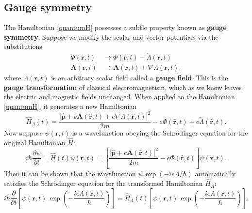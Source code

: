 \documentclass[prx,12pt]{revtex4-2}
\begin{document}
\subsection{Gauge symmetry}
\label{sec:gauge}

The Hamiltonian \eqref{quantumH} possesses a subtle property known as
\textbf{gauge symmetry}.  Suppose we modify the scalar and vector
potentials via the substitutions
\begin{align}
  \Phi(\mathbf{r},t) &\rightarrow \Phi(\mathbf{r},t) - \dot{\Lambda}(\mathbf{r},t) \label{gauge-subst-1} \\
  \mathbf{A}(\mathbf{r},t) &\rightarrow
  \mathbf{A}(\mathbf{r},t) + \nabla{\Lambda}(\mathbf{r},t),
  \label{gauge-subst-2}
\end{align}
where $\Lambda(\mathbf{r},t)$ is an arbitrary scalar field called a
\textbf{gauge field}.  This is the \textbf{gauge transformation} of
classical electromagnetism, which as we know leaves the electric and
magnetic fields unchanged.  When applied to the Hamiltonian
\eqref{quantumH}, it generates a new Hamiltonian
\begin{equation}
  \hat{H}_\Lambda(t)
  = \frac{|\hat{\mathbf{p}}+e\mathbf{A}(\hat{\mathbf{r}},t) + e\nabla\Lambda(\hat{\mathbf{r}},t)|^2}{2m}
  - e\Phi(\hat{\mathbf{r}},t) + e\dot{\Lambda}(\hat{\mathbf{r}},t).
\end{equation}
Now suppose $\psi(\mathbf{r},t)$ is a wavefunction obeying the
Schr\"odinger equation for the original Hamiltonian $\hat{H}$:
\begin{equation}
  i\hbar\frac{\partial\psi}{\partial t} =
  \hat{H}(t) \psi(\mathbf{r},t)
  = \left[\frac{|\hat{\mathbf{p}}+e\mathbf{A}(\hat{\mathbf{r}},t)|^2}{2m}
  - e\Phi(\hat{\mathbf{r}},t) \right]\psi(\mathbf{r},t).
\end{equation}
Then it can be shown that the wavefunction $\psi\,
\exp(-ie\Lambda/\hbar)$ automatically satisfies the Schr\"odinger
equation for the transformed Hamiltonian $\hat{H}_\Lambda$:
\begin{equation}
  i\hbar\frac{\partial}{\partial t} \left[\psi(\mathbf{r},t) \, \exp\left(-\frac{ie\Lambda(\mathbf{r},t)}{\hbar}\right)\right] =
  \hat{H}_\Lambda(t) \left[\psi(\mathbf{r},t) \, \exp\left(-\frac{ie\Lambda(\mathbf{r},t)}{\hbar}\right)\right].
  \label{gaugeschrod}
\end{equation}
\end{document}
